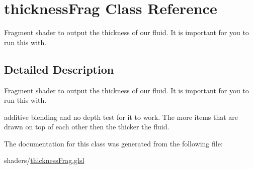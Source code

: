 \hypertarget{classthickness_frag}{\section{thickness\-Frag Class Reference}
\label{classthickness_frag}
}


Fragment shader to output the thickness of our fluid. It is important for you to run this with.  




\subsection{Detailed Description}
Fragment shader to output the thickness of our fluid. It is important for you to run this with. 

additive blending and no depth test for it to work. The more items that are drawn on top of each other then the thicker the fluid. 

The documentation for this class was generated from the following file\-:\begin{DoxyCompactItemize}
\item 
shaders/\hyperlink{thickness_frag_8glsl}{thickness\-Frag.\-glsl}\end{DoxyCompactItemize}
